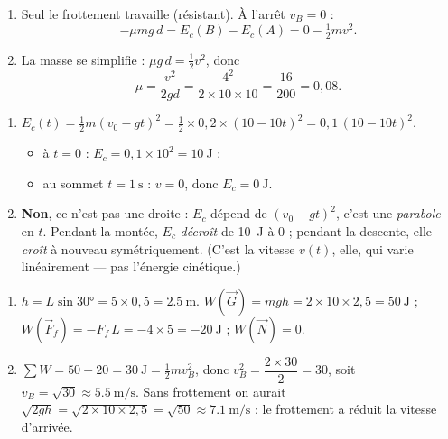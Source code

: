 \documentclass[11pt,a4paper]{article}
\newcommand{\vv}[1]{\vec{#1}}\newcommand{\ds}{\displaystyle}
\begin{document}

\begin{corrige}
\begin{enumerate}[label=\alph*)]
  \item Seul le frottement travaille (résistant). À l'arrêt $v_B=0$ :
        \[
        -\mu mg\,d=E_c(B)-E_c(A)=0-\tfrac12 m v^2 .
        \]
  \item La masse se simplifie : $\mu g\,d=\tfrac12 v^2$, donc
        \[
        \mu=\frac{v^2}{2gd}=\frac{4^2}{2\times10\times10}=\frac{16}{200}=0,08 .
        \]
\end{enumerate}
\end{corrige}

\begin{corrige}
\begin{enumerate}[label=\alph*)]
  \item $E_c(t)=\tfrac12 m (v_0-gt)^2=\tfrac12\times0,2\times(10-10t)^2=0,1\,(10-10t)^2$.
        \begin{itemize}[leftmargin=1.4em,topsep=1pt]
          \item à $t=0$ : $E_c=0,1\times10^2=\qty{10}{\joule}$ ;
          \item au sommet $t=\qty{1}{\second}$ : $v=0$, donc $E_c=\qty{0}{\joule}$.
        \end{itemize}
  \item \textbf{Non}, ce n'est pas une droite : $E_c$ dépend de $(v_0-gt)^2$, c'est une \emph{parabole}
        en $t$. Pendant la montée, $E_c$ \emph{décroît} de \qty{10}{\joule} à $0$ ; pendant la descente,
        elle \emph{croît} à nouveau symétriquement. (C'est la vitesse $v(t)$, elle, qui varie
        linéairement — pas l'énergie cinétique.)
\end{enumerate}
\end{corrige}

\begin{corrige}
\begin{enumerate}[label=\alph*)]
  \item $h=L\sin\ang{30}=5\times0,5=\qty{2,5}{\metre}$.
        $W(\vv G)=mgh=2\times10\times2,5=\qty{50}{\joule}$ ;
        $W(\vv F_f)=-F_f\,L=-4\times5=\qty{-20}{\joule}$ ; $W(\vv N)=0$.
  \item $\sum W=50-20=\qty{30}{\joule}=\tfrac12 m v_B^2$, donc
        $v_B^2=\dfrac{2\times30}{2}=30$, soit $v_B=\sqrt{30}\approx\qty{5,5}{\metre\per\second}$.
        Sans frottement on aurait $\sqrt{2gh}=\sqrt{2\times10\times2,5}=\sqrt{50}\approx\qty{7,1}{\metre\per\second}$ :
        le frottement a réduit la vitesse d'arrivée.
\end{enumerate}
\end{corrige}
\end{document}
